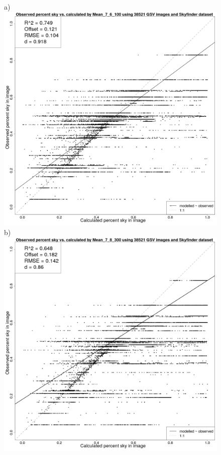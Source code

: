 \documentclass[final,3p,times,authoryear]{elsarticle}
\begin{document}
\begin{figure}
\centering
a)\includegraphics[scale=0.15]{Images/ErrorPlotsCombinedIndivMean_7_6_100.png}
b)\includegraphics[scale=0.15]{Images/ErrorPlotsCombinedIndivMean_7_8_300.png}

\end{figure}
\end{document}
